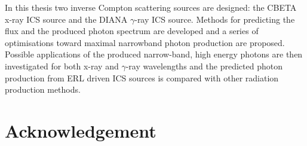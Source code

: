 \documentclass[11pt,oneside]{thesisformat}
\begin{document}
In this thesis two inverse Compton scattering sources are designed: the CBETA x-ray ICS source and the DIANA $\gamma$-ray ICS source. Methods for predicting the flux and the produced photon spectrum are developed and a series of optimisations toward maximal narrowband photon production are proposed. Possible applications of the produced narrow-band, high energy photons are then investigated for both x-ray and $\gamma$-ray wavelengths and the predicted photon production from ERL driven ICS sources is compared with other radiation production methods.   

\chapter*{Acknowledgement}















%


\end{document}
